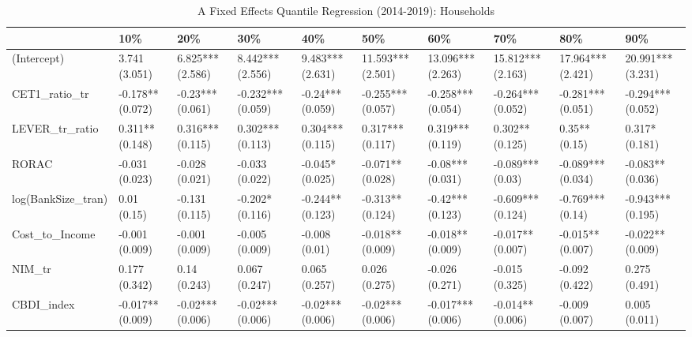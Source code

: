 \begin{table}[ht]
\centering
\caption{A Fixed Effects Quantile Regression (2014-2019): Households} 
\begingroup\small
\begin{tabular}{llllllllll}
  \toprule
 & 10\% & 20\% & 30\% & 40\% & 50\% & 60\% & 70\% & 80\% & 90\% \\ 
  \midrule
(Intercept) & 3.741 (3.051) & 6.825*** (2.586) & 8.442*** (2.556) & 9.483*** (2.631) & 11.593*** (2.501) & 13.096*** (2.263) & 15.812*** (2.163) & 17.964*** (2.421) & 20.991*** (3.231) \\ 
  CET1\_ratio\_tr & -0.178** (0.072) & -0.23*** (0.061) & -0.232*** (0.059) & -0.24*** (0.059) & -0.255*** (0.057) & -0.258*** (0.054) & -0.264*** (0.052) & -0.281*** (0.051) & -0.294*** (0.052) \\ 
  LEVER\_tr\_ratio & 0.311** (0.148) & 0.316*** (0.115) & 0.302*** (0.113) & 0.304*** (0.115) & 0.317*** (0.117) & 0.319*** (0.119) & 0.302** (0.125) & 0.35** (0.15) & 0.317* (0.181) \\ 
  RORAC & -0.031 (0.023) & -0.028 (0.021) & -0.033 (0.022) & -0.045* (0.025) & -0.071** (0.028) & -0.08*** (0.031) & -0.089*** (0.03) & -0.089*** (0.034) & -0.083** (0.036) \\ 
  log(BankSize\_tran) & 0.01 (0.15) & -0.131 (0.115) & -0.202* (0.116) & -0.244** (0.123) & -0.313** (0.124) & -0.42*** (0.123) & -0.609*** (0.124) & -0.769*** (0.14) & -0.943*** (0.195) \\ 
  Cost\_to\_Income & -0.001 (0.009) & -0.001 (0.009) & -0.005 (0.009) & -0.008 (0.01) & -0.018** (0.009) & -0.018** (0.009) & -0.017** (0.007) & -0.015** (0.007) & -0.022** (0.009) \\ 
  NIM\_tr & 0.177 (0.342) & 0.14 (0.243) & 0.067 (0.247) & 0.065 (0.257) & 0.026 (0.275) & -0.026 (0.271) & -0.015 (0.325) & -0.092 (0.422) & 0.275 (0.491) \\ 
  CBDI\_index & -0.017** (0.009) & -0.02*** (0.006) & -0.02*** (0.006) & -0.02*** (0.006) & -0.02*** (0.006) & -0.017*** (0.006) & -0.014** (0.006) & -0.009 (0.007) & 0.005 (0.011) \\ 
   \bottomrule
\end{tabular}
\endgroup
\end{table}
